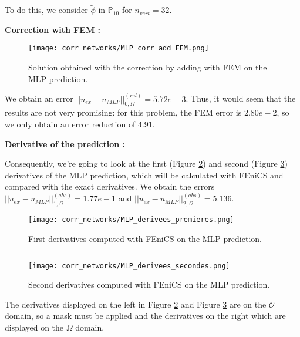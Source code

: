To do this, we consider $\tilde{\phi}$ in $\mathbb{P}_10$ for $n_{vert}=32$.

\textbf{Correction with FEM :}

\begin{figure}[H]
	\centering
	\texttt{[image: corr\_networks/MLP\_corr\_add\_FEM.png]}
	\caption{Solution obtained with the correction by adding with FEM on the MLP prediction.}
	\label{corr_networks_MLP_corr_add_FEM}
\end{figure}

We obtain an error $||u_{ex}-u_{MLP}||_{0,\Omega}^{(rel)}=5.72e-3$. Thus, it would seem that the results are not very promising: for this problem, the FEM error is $2.80e-2$, so we only obtain an error reduction of $4.91$.

\newpage

\textbf{Derivative of the prediction :}

Consequently, we're going to look at the first (Figure \ref{corr_networks_MLP_derivees_premieres}) and second (Figure \ref{corr_networks_MLP_derivees_secondes}) derivatives of the MLP prediction, which will be calculated with FEniCS and compared with the exact derivatives. We obtain the errors $||u_{ex}-u_{MLP}||_{1,\Omega}^{(abs)}=1.77e-1$ and $||u_{ex}-u_{MLP}||_{2,\Omega}^{(abs)}=5.136$.

\begin{minipage}{0.48\linewidth}
	\begin{figure}[H]
		\centering
		\texttt{[image: corr\_networks/MLP\_derivees\_premieres.png]}
		\caption{First derivatives computed with FEniCS on the MLP prediction.}
		\label{corr_networks_MLP_derivees_premieres}
	\end{figure} 
\end{minipage} $\qquad$
\begin{minipage}{0.48\linewidth}
	\begin{figure}[H]
		\centering
		\texttt{[image: corr\_networks/MLP\_derivees\_secondes.png]}
		\caption{Second derivatives computed with FEniCS on the MLP prediction.}
		\label{corr_networks_MLP_derivees_secondes}
	\end{figure} 
\end{minipage}

\begin{Rem}
	The derivatives displayed on the left in Figure \ref{corr_networks_MLP_derivees_premieres} and Figure \ref{corr_networks_MLP_derivees_secondes} are on the $\mathcal{O}$ domain, so a mask must be applied and the derivatives on the right which are displayed on the $\Omega$ domain.
\end{Rem}

